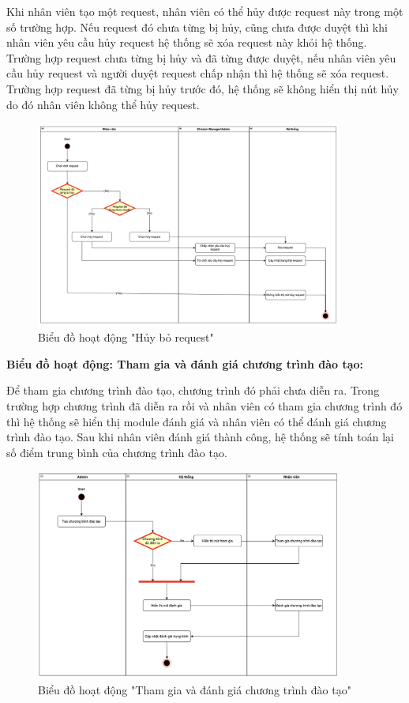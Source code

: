 \documentclass[../DoAn.tex]{subfiles}
\begin{document}
Khi nhân viên tạo một request, nhân viên có thể hủy được request này trong một số trường hợp. Nếu request đó chưa từng bị hủy, cũng chưa được duyệt thì khi nhân viên yêu cầu hủy request hệ thống sẽ xóa request này khỏi hệ thống. Trường hợp request chưa từng bị hủy và đã từng được duyệt, nếu nhân viên yêu cầu hủy request và người duyệt request chấp nhận thì hệ thống sẽ xóa request. Trường hợp request đã từng bị hủy trước đó, hệ thống sẽ không hiển thị nút hủy do đó nhân viên không thể hủy request.
\begin{figure}[H]
    \centering
    \includegraphics[width=0.9\textwidth]{Hinhve/AD_HuyRequest.png}
    \caption{Biểu đồ hoạt động "Hủy bỏ request"}
\end{figure}

\textbf{Biểu đồ hoạt động: Tham gia và đánh giá chương trình đào tạo:}

Để tham gia chương trình đào tạo, chương trình đó phải chưa diễn ra. Trong trường hợp chương trình đã diễn ra rồi và nhân viên có tham gia chương trình đó thì hệ thống sẽ hiển thị module đánh giá và nhân viên có thể đánh giá chương trình đào tạo. Sau khi nhân viên đánh giá thành công, hệ thống sẽ tính toán lại số điểm trung bình của chương trình đào tạo.
\begin{figure}[H]
    \centering
    \includegraphics[width=0.9\textwidth]{Hinhve/AD_ThamGiaDanhGiaChuongTrinhDaoTao.png}
    \caption{Biểu đồ hoạt động "Tham gia và đánh giá chương trình đào tạo"}
\end{figure}
\end{document}
